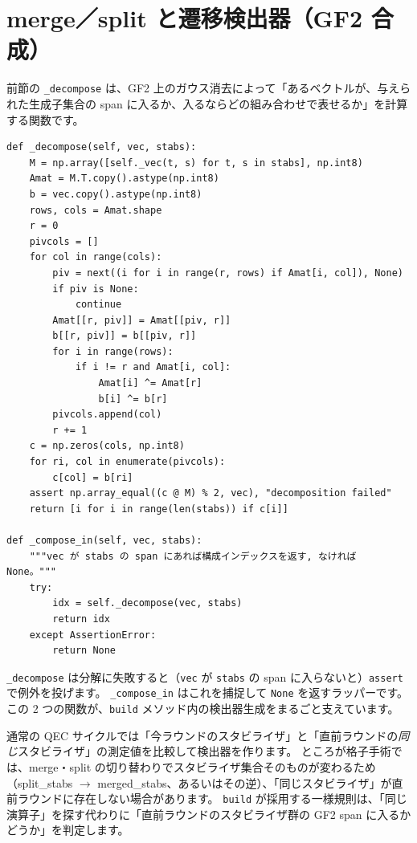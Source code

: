 \section{merge／split と遷移検出器（GF2 合成）}\label{sec:transition_det}

前節の \texttt{\_decompose} は、GF2 上のガウス消去によって「あるベクトルが、与えられた生成子集合の span に入るか、入るならどの組み合わせで表せるか」を計算する関数です。

\begin{lstlisting}[caption={GF2 合成: \_decompose と \_compose\_in（src/stages/01\_mpp/src/ftqc/geom\_lattice\_surgery.py）}]
def _decompose(self, vec, stabs):
    M = np.array([self._vec(t, s) for t, s in stabs], np.int8)
    Amat = M.T.copy().astype(np.int8)
    b = vec.copy().astype(np.int8)
    rows, cols = Amat.shape
    r = 0
    pivcols = []
    for col in range(cols):
        piv = next((i for i in range(r, rows) if Amat[i, col]), None)
        if piv is None:
            continue
        Amat[[r, piv]] = Amat[[piv, r]]
        b[[r, piv]] = b[[piv, r]]
        for i in range(rows):
            if i != r and Amat[i, col]:
                Amat[i] ^= Amat[r]
                b[i] ^= b[r]
        pivcols.append(col)
        r += 1
    c = np.zeros(cols, np.int8)
    for ri, col in enumerate(pivcols):
        c[col] = b[ri]
    assert np.array_equal((c @ M) % 2, vec), "decomposition failed"
    return [i for i in range(len(stabs)) if c[i]]

def _compose_in(self, vec, stabs):
    """vec が stabs の span にあれば構成インデックスを返す, なければ None。"""
    try:
        idx = self._decompose(vec, stabs)
        return idx
    except AssertionError:
        return None
\end{lstlisting}

\texttt{\_decompose} は分解に失敗すると（\texttt{vec} が \texttt{stabs} の span に入らないと）\texttt{assert} で例外を投げます。
\texttt{\_compose\_in} はこれを捕捉して \texttt{None} を返すラッパーです。
この 2 つの関数が、\texttt{build} メソッド内の検出器生成をまるごと支えています。

通常の QEC サイクルでは「今ラウンドのスタビライザ」と「直前ラウンドの\emph{同じ}スタビライザ」の測定値を比較して検出器を作ります。
ところが格子手術では、merge・split の切り替わりでスタビライザ集合そのものが変わるため（split\_stabs $\to$ merged\_stabs、あるいはその逆）、「同じスタビライザ」が直前ラウンドに存在しない場合があります。
\texttt{build} が採用する一様規則は、「同じ演算子」を探す代わりに「直前ラウンドのスタビライザ群の GF2 span に入るかどうか」を判定します。


